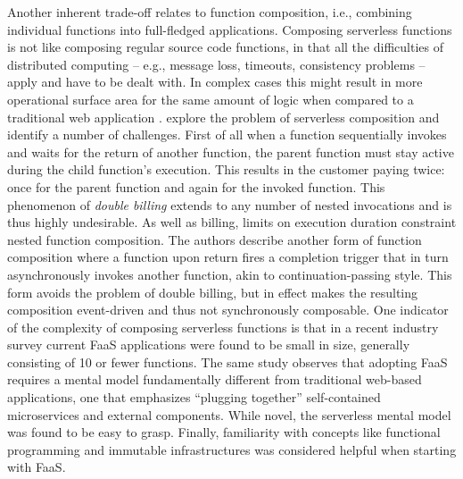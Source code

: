 Another inherent trade-off relates to function composition, i.e., combining individual functions into full-fledged applications. Composing serverless functions is not like composing regular source code functions, in that all the difficulties of distributed computing -- e.g., message loss, timeouts, consistency problems -- apply and have to be dealt with. In complex cases this might result in more operational surface area for the same amount of logic when compared to a traditional web application \parencite{cncf18serverlessWG}. \textcite{baldini17trilemma} explore the problem of serverless composition and identify a number of challenges. First of all when a function sequentially invokes and waits for the return of another function, the parent function must stay active during the child function's execution. This results in the customer paying twice: once for the parent function and again for the invoked function. This phenomenon of \textit{double billing} extends to any number of nested invocations and is thus highly undesirable. As well as billing, limits on execution duration constraint nested function composition. The authors describe another form of function composition where a function upon return fires a completion trigger that in turn asynchronously invokes another function, akin to continuation-passing style. This form avoids the problem of double billing, but in effect makes the resulting composition event-driven and thus not synchronously composable. One indicator of the complexity of composing serverless functions is that in a recent industry survey \parencite{leitner18industrialpractice} current FaaS applications were found to be small in size, generally consisting of 10 or fewer functions. The same study observes that adopting FaaS requires a mental model fundamentally different from traditional web-based applications, one that emphasizes ``plugging together'' self-contained microservices and external components. While novel, the serverless mental model was found to be easy to grasp. Finally, familiarity with concepts like functional programming and immutable infrastructures was considered helpful when starting with FaaS.

